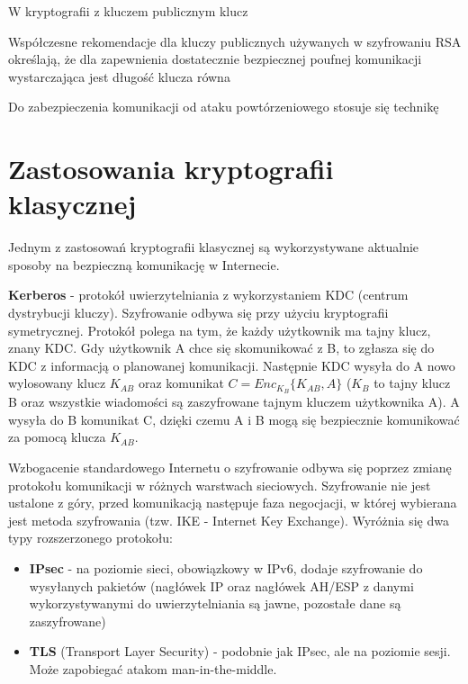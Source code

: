 \begin{problems}
    \prob W kryptografii z kluczem publicznym klucz
    
    
    \prob Współczesne rekomendacje dla kluczy publicznych używanych w szyfrowaniu RSA określają, że dla zapewnienia dostatecznie bezpiecznej poufnej komunikacji wystarczająca jest długość klucza równa

    
    \prob Do zabezpieczenia komunikacji od ataku powtórzeniowego stosuje się technikę
 
 \end{problems}



\section{Zastosowania kryptografii klasycznej}

Jednym z zastosowań kryptografii klasycznej są wykorzystywane aktualnie sposoby na bezpieczną komunikację w Internecie.

\textbf{Kerberos} - protokół uwierzytelniania z wykorzystaniem KDC (centrum dystrybucji kluczy). Szyfrowanie odbywa się przy użyciu kryptografii symetrycznej. Protokół polega na tym, że każdy użytkownik ma tajny klucz, znany KDC. Gdy użytkownik A chce się skomunikować z B, to zgłasza się do KDC z informacją o planowanej komunikacji. Następnie KDC wysyła do A nowo wylosowany klucz $K_{AB}$ oraz komunikat $C=Enc_{K_B}\{K_{AB}, A\}$ ($K_B$ to tajny klucz B oraz wszystkie wiadomości są zaszyfrowane tajnym kluczem użytkownika A). A wysyła do B komunikat C, dzięki czemu A i B mogą się bezpiecznie komunikować za pomocą klucza $K_{AB}$.

Wzbogacenie standardowego Internetu o szyfrowanie odbywa się poprzez zmianę protokołu komunikacji w różnych warstwach sieciowych. Szyfrowanie nie jest ustalone z góry, przed komunikacją następuje faza negocjacji, w której wybierana jest metoda szyfrowania (tzw. IKE - Internet Key Exchange). Wyróżnia się dwa typy rozszerzonego protokołu:
\begin{itemize}
    \item \textbf{IPsec} - na poziomie sieci, obowiązkowy w IPv6, dodaje szyfrowanie do wysyłanych pakietów (nagłówek IP oraz nagłówek AH/ESP z danymi wykorzystywanymi do uwierzytelniania są jawne, pozostałe dane są zaszyfrowane)
    \item \textbf{TLS} (Transport Layer Security) - podobnie jak IPsec, ale na poziomie sesji. Może zapobiegać atakom man-in-the-middle.
\end{itemize}

